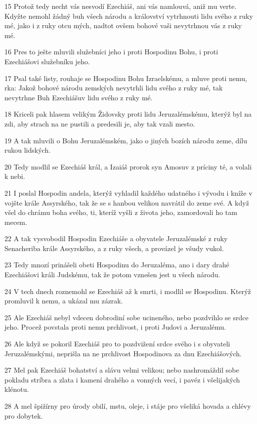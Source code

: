 \par 15 Protož tedy necht vás nesvodí Ezechiáš, ani vás namlouvá, aniž mu verte. Kdyžte nemohl žádný buh všech národu a království vytrhnouti lidu svého z ruky mé, jako i z ruky otcu mých, nadtot ovšem bohové vaši nevytrhnou vás z ruky mé.
\par 16 Pres to ješte mluvili služebníci jeho i proti Hospodinu Bohu, i proti Ezechiášovi služebníku jeho.
\par 17 Psal také listy, rouhaje se Hospodinu Bohu Izraelskému, a mluve proti nemu, rka: Jakož bohové národu zemských nevytrhli lidu svého z ruky mé, tak nevytrhne Buh Ezechiášuv lidu svého z ruky mé.
\par 18 Kriceli pak hlasem velikým Židovsky proti lidu Jeruzalémskému, kterýž byl na zdi, aby strach na ne pustili a predesili je, aby tak vzali mesto.
\par 19 A tak mluvili o Bohu Jeruzalémském, jako o jiných bozích národu zeme, dílu rukou lidských.
\par 20 Tedy modlil se Ezechiáš král, a Izaiáš prorok syn Amosuv z príciny té, a volali k nebi.
\par 21 I poslal Hospodin andela, kterýž vyhladil každého udatného i vývodu i kníže v vojšte krále Assyrského, tak že se s hanbou velikou navrátil do zeme své. A když všel do chrámu boha svého, ti, kteríž vyšli z života jeho, zamordovali ho tam mecem.
\par 22 A tak vysvobodil Hospodin Ezechiáše a obyvatele Jeruzalémské z ruky Senacheriba krále Assyrského, a z ruky všech, a provázel je všudy vukol.
\par 23 Tedy mnozí prinášeli obeti Hospodinu do Jeruzaléma, ano i dary drahé Ezechiášovi králi Judskému, tak že potom vznešen jest u všech národu.
\par 24 V tech dnech roznemohl se Ezechiáš až k smrti, i modlil se Hospodinu. Kterýž promluvil k nemu, a ukázal mu zázrak.
\par 25 Ale Ezechiáš nebyl vdecen dobrodiní sobe ucineného, nebo pozdvihlo se srdce jeho. Procež povstala proti nemu prchlivost, i proti Judovi a Jeruzalému.
\par 26 Ale když se pokoril Ezechiáš pro to pozdvižení srdce svého i s obyvateli Jeruzalémskými, neprišla na ne prchlivost Hospodinova za dnu Ezechiášových.
\par 27 Mel pak Ezechiáš bohatství a slávu velmi velikou; nebo nashromáždil sobe pokladu stríbra a zlata i kamení drahého a vonných vecí, i pavéz i všelijakých klénotu.
\par 28 A mel špižírny pro úrody obilí, mstu, oleje, i stáje pro všeliká hovada a chlévy pro dobytek.
